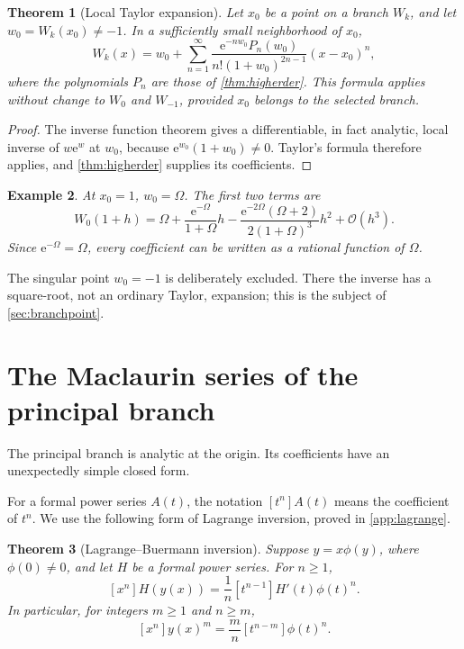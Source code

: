 \documentclass[11pt]{article}
\newtheorem{theorem}{Theorem}[section]
\newtheorem{example}[theorem]{Example}
\theoremstyle{remark}
\newcommand{\ee}{\mathrm e}
\newcommand{\bigO}{\mathcal O}
\begin{document}
\begin{theorem}[Local Taylor expansion]\label{thm:generalTaylor}
Let \(x_0\) be a point on a branch \(W_k\), and let
\(w_0=W_k(x_0)\neq-1\).  In a sufficiently small neighborhood of \(x_0\),
\begin{equation}\label{eq:generalTaylor}
 W_k(x)=w_0+
 \sum_{n=1}^{\infty}
 \frac{\ee^{-nw_0}P_n(w_0)}
      {n!(1+w_0)^{2n-1}}(x-x_0)^n,
\end{equation}
where the polynomials \(P_n\) are those of
\cref{thm:higherder}.  This formula applies without change to \(W_0\) and
\(W_{-1}\), provided \(x_0\) belongs to the selected branch.
\end{theorem}

\begin{proof}
The inverse function theorem gives a differentiable, in fact analytic, local
inverse of \(w\ee^w\) at \(w_0\), because
\(\ee^{w_0}(1+w_0)\neq0\).  Taylor's formula therefore applies, and
\cref{thm:higherder} supplies its coefficients.
\end{proof}

\begin{example}
At \(x_0=1\), \(w_0=\Omega\).  The first two terms are
\[
 W_0(1+h)=\Omega+
 \frac{\ee^{-\Omega}}{1+\Omega}h
 -\frac{\ee^{-2\Omega}(\Omega+2)}
        {2(1+\Omega)^3}h^2+\bigO(h^3).
\]
Since \(\ee^{-\Omega}=\Omega\), every coefficient can be written as a
rational function of \(\Omega\).
\end{example}

The singular point \(w_0=-1\) is deliberately excluded.  There the inverse
has a square-root, not an ordinary Taylor, expansion; this is the subject of
\cref{sec:branchpoint}.

\section{The Maclaurin series of the principal branch}\label{sec:maclaurin}

The principal branch is analytic at the origin.  Its coefficients have an
unexpectedly simple closed form.

For a formal power series \(A(t)\), the notation \([t^n]A(t)\) means the
coefficient of \(t^n\).  We use the following form of Lagrange inversion,
proved in \cref{app:lagrange}.

\begin{theorem}[Lagrange--Buer\-mann inversion]\label{thm:lagrange}
Suppose \(y=x\phi(y)\), where \(\phi(0)\neq0\), and let \(H\) be a formal
power series.  For \(n\geq1\),
\begin{equation}\label{eq:lagrange}
 [x^n]H(y(x))
 =\frac1n[t^{n-1}]H'(t)\phi(t)^n.
\end{equation}
In particular, for integers \(m\geq1\) and \(n\geq m\),
\begin{equation}\label{eq:lagrange-power}
 [x^n]y(x)^m
 =\frac{m}{n}[t^{n-m}]\phi(t)^n.
\end{equation}
\end{theorem}
\end{document}
